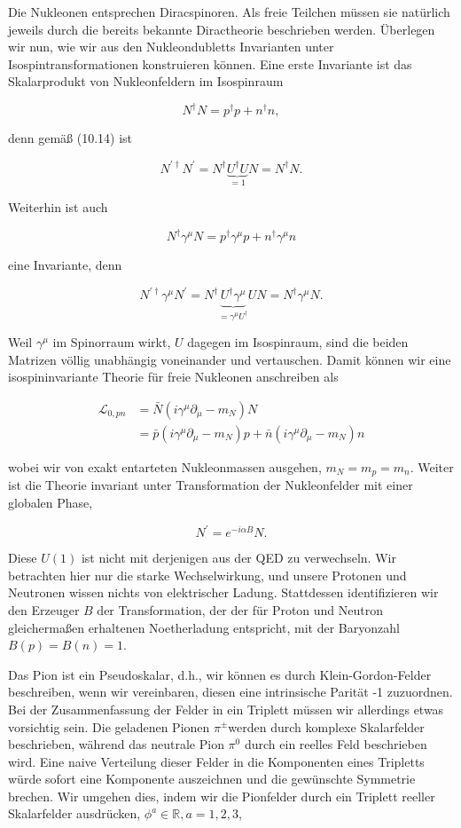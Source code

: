 \documentclass[10pt, letterpaper]{article}
\begin{document}
Die Nukleonen entsprechen Diracspinoren. Als freie Teilchen müssen sie natürlich jeweils durch die bereits bekannte Diractheorie beschrieben werden. Überlegen wir nun, wie wir aus den Nukleondubletts Invarianten unter Isospintransformationen konstruieren können. Eine erste Invariante ist das Skalarprodukt von Nukleonfeldern im Isospinraum

$$
N^{\dagger} N=p^{\dagger} p+n^{\dagger} n,
$$

denn gemäß (10.14) ist

$$
N^{\prime \dagger} N^{\prime}=N^{\dagger} \underbrace{U^{\dagger} U}_{=1} N=N^{\dagger} N .
$$

Weiterhin ist auch

$$
N^{\dagger} \gamma^{\mu} N=p^{\dagger} \gamma^{\mu} p+n^{\dagger} \gamma^{\mu} n
$$

eine Invariante, denn

$$
N^{\prime \dagger} \gamma^{\mu} N^{\prime}=N^{\dagger} \underbrace{U^{\dagger} \gamma^{\mu}}_{=\gamma^{\mu} U^{\dagger}} U N=N^{\dagger} \gamma^{\mu} N .
$$

Weil $\gamma^{\mu}$ im Spinorraum wirkt, $U$ dagegen im Isospinraum, sind die beiden Matrizen völlig unabhängig voneinander und vertauschen. Damit können wir eine isospininvariante Theorie für freie Nukleonen anschreiben als

$$
\begin{aligned}
\mathscr{L}_{0, p n} & =\bar{N}\left(i \gamma^{\mu} \partial_{\mu}-m_{N}\right) N \\
& =\bar{p}\left(i \gamma^{\mu} \partial_{\mu}-m_{N}\right) p+\bar{n}\left(i \gamma^{\mu} \partial_{\mu}-m_{N}\right) n
\end{aligned}
$$

wobei wir von exakt entarteten Nukleonmassen ausgehen, $m_{N}=m_{p}=m_{n}$. Weiter ist die Theorie invariant unter Transformation der Nukleonfelder mit einer globalen Phase,

$$
N^{\prime}=e^{-i \alpha B} N .
$$

Diese $U(1)$ ist nicht mit derjenigen aus der QED zu verwechseln. Wir betrachten hier nur die starke Wechselwirkung, und unsere Protonen und Neutronen wissen nichts von elektrischer Ladung. Stattdessen identifizieren wir den Erzeuger $B$ der Transformation, der der für Proton und Neutron gleichermaßen erhaltenen Noetherladung entspricht, mit der Baryonzahl $B(p)=B(n)=1$.

Das Pion ist ein Pseudoskalar, d.h., wir können es durch Klein-Gordon-Felder beschreiben, wenn wir vereinbaren, diesen eine intrinsische Parität -1 zuzuordnen. Bei der Zusammenfassung der Felder in ein Triplett müssen wir allerdings etwas vorsichtig sein. Die geladenen Pionen $\pi^{ \pm}$werden durch komplexe Skalarfelder beschrieben, während das neutrale Pion $\pi^{0}$ durch ein reelles Feld beschrieben wird. Eine naive Verteilung dieser Felder in die Komponenten eines Tripletts würde sofort eine Komponente auszeichnen und die gewünschte Symmetrie brechen. Wir umgehen dies, indem wir die Pionfelder durch ein Triplett reeller Skalarfelder ausdrücken, $\phi^{a} \in \mathbb{R}, a=1,2,3$,
\end{document}

